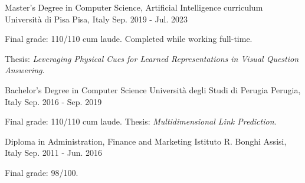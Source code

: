 

\begin{cventries}

  \cventry
    {Master's Degree in Computer Science, Artificial Intelligence curriculum} %
    {Università di Pisa} %
    {Pisa, Italy} %
    {Sep. 2019 - Jul. 2023} %
    {
      \begin{cvitems} %
        \item {Final grade: 110/110 cum laude. Completed while working full-time.}
        \item {Thesis: \textit{Leveraging Physical Cues for Learned Representations in Visual Question Answering}.}
      \end{cvitems}
    }

  \cventry
    {Bachelor's Degree in Computer Science} %
    {Università degli Studi di Perugia} %
    {Perugia, Italy} %
    {Sep. 2016 - Sep. 2019} %
    {
      \begin{cvitems} %
        \item {Final grade: 110/110 cum laude. Thesis: \textit{Multidimensional Link Prediction}.}
      \end{cvitems}
    }

  \cventry
    {Diploma in Administration, Finance and Marketing} %
    {Istituto R. Bonghi} %
    {Assisi, Italy} %
    {Sep. 2011 - Jun. 2016} %
    {
      \begin{cvitems} %
        \item {Final grade: 98/100.}
      \end{cvitems}
    }

\end{cventries}
